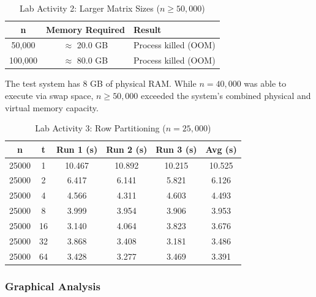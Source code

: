 \documentclass[journal]{IEEEtran}
\begin{document}
\begin{table}[H]
    \centering
    \caption{Lab Activity 2: Larger Matrix Sizes ($n \geq 50{,}000$)}
    \label{tab:act2_failed}
    \footnotesize
    \begin{tabular}{|c|c|p{5cm}|}
        \hline
        \textbf{n} & \textbf{Memory Required} & \textbf{Result} \\
        \hline
        50,000  & $\approx$ 20.0 GB & Process killed (OOM) \\
        \hline
        100,000 & $\approx$ 80.0 GB & Process killed (OOM) \\
        \hline
    \end{tabular}
    \begin{flushleft}
    \footnotesize
    The test system has 8 GB of physical RAM. While $n = 40{,}000$ was able to execute via swap space, $n \geq 50{,}000$ exceeded the system's combined physical and virtual memory capacity.
    \end{flushleft}
\end{table}

\begin{table}[H]
    \centering
    \caption{Lab Activity 3: Row Partitioning ($n = 25{,}000$)}
    \label{tab:act3_results}
    \footnotesize
    \begin{tabular}{|c|c|c|c|c|c|}
        \hline
        \textbf{n} & \textbf{t} & \textbf{Run 1 (s)} & \textbf{Run 2 (s)} & \textbf{Run 3 (s)} & \textbf{Avg (s)} \\
        \hline
        25000 & 1  & 10.467 & 10.892 & 10.215 & 10.525 \\
        \hline
        25000 & 2  & 6.417  & 6.141  & 5.821  & 6.126  \\
        \hline
        25000 & 4  & 4.566  & 4.311  & 4.603  & 4.493  \\
        \hline
        25000 & 8  & 3.999  & 3.954  & 3.906  & 3.953  \\
        \hline
        25000 & 16 & 3.140  & 4.064  & 3.823  & 3.676  \\
        \hline
        25000 & 32 & 3.868  & 3.408  & 3.181  & 3.486  \\
        \hline
        25000 & 64 & 3.428  & 3.277  & 3.469  & 3.391  \\
        \hline
    \end{tabular}
\end{table}

\subsubsection{Graphical Analysis}
\end{document}
